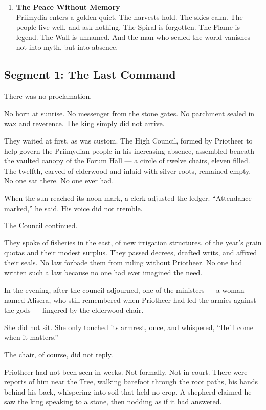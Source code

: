 \documentclass[9pt]{article}
\begin{document}
\begin{enumerate}
    \vspace{1em}
    \item \textbf{The Peace Without Memory} \\
    Priimydia enters a golden quiet. The harvests hold. The skies calm. The people live well, and ask nothing. The Spiral is forgotten. The Flame is legend. The Wall is unnamed. And the man who sealed the world vanishes — not into myth, but into absence.

\end{enumerate}



\newpage

\subsection*{Segment 1: The Last Command}

There was no proclamation.

No horn at sunrise. No messenger from the stone gates. No parchment sealed in wax and reverence. The king simply did not arrive.

They waited at first, as was custom. The High Council, formed by Priotheer to help govern the Priimydian people in his increasing absence, assembled beneath the vaulted canopy of the Forum Hall — a circle of twelve chairs, eleven filled. The twelfth, carved of elderwood and inlaid with silver roots, remained empty. No one sat there. No one ever had.

When the sun reached its noon mark, a clerk adjusted the ledger. “Attendance marked,” he said. His voice did not tremble.

The Council continued.

They spoke of fisheries in the east, of new irrigation structures, of the year’s grain quotas and their modest surplus. They passed decrees, drafted writs, and affixed their seals. No law forbade them from ruling without Priotheer. No one had written such a law because no one had ever imagined the need.

In the evening, after the council adjourned, one of the ministers — a woman named Alisera, who still remembered when Priotheer had led the armies against the gods — lingered by the elderwood chair.

She did not sit. She only touched its armrest, once, and whispered, “He’ll come when it matters.”

The chair, of course, did not reply.

Priotheer had not been seen in weeks. Not formally. Not in court. There were reports of him near the Tree, walking barefoot through the root paths, his hands behind his back, whispering into soil that held no crop. A shepherd claimed he saw the king speaking to a stone, then nodding as if it had answered.
\end{document}
